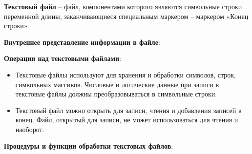 \begin{myquote}
            
\end{myquote}

\noindent
{\bf {Текстовый файл}} – файл, компонентами которого являются символьные строки переменной длины, заканчивающиеся специальным маркером – маркером «Конец строки». 
 
\noindent
{\bf {Внутреннее представление информации в файле}}:

\noindent
{\bf {Операции над текстовыми файлами}}:
\begin{itemize}
\item Текстовые файлы используют для хранения и обработки символов, строк, символьных массивов. Числовые и логические данные при записи в текстовые файлы должны преобразовываться в символьные строки.
\item Текстовый файл можно открыть для записи, чтения и добавления записей в конец. Файл, открытый для записи, не может использоваться для чтения и наоборот. 
\end{itemize}

\noindent
{\bf {Процедуры и функции обработки текстовых файлов}}: 

